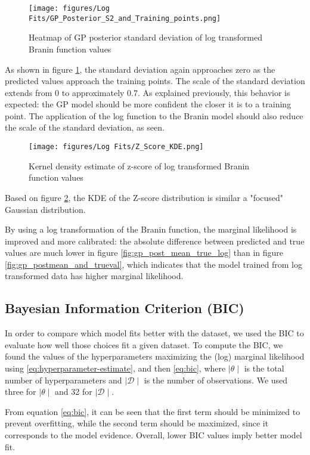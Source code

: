 \documentclass[11pt]{article}
\newcommand{\mc}[1]{\mathcal{#1}}
\newcommand{\data}{\mc{D}}
\numberwithin{equation}{section}
\begin{document}
\begin{figure}[H]
  \centering
  \texttt{[image: figures/Log Fits/GP\_Posterior\_S2\_and\_Training\_points.png]}
  \caption{Heatmap of GP posterior standard deviation of log transformed Branin function values}
  \label{fig:gp_post_std_log}
\end{figure}
As shown in figure \ref{fig:gp_post_std_log}, the standard deviation again approaches zero as the predicted values approach the training points. The scale of the standard deviation extends from 0 to approximately 0.7. As explained previously, this behavior is expected: the GP model should be more confident the closer it is to a training point. The application of the log function to the Branin model should also reduce the scale of the standard deviation, as seen. 

\begin{figure}[H]
  \centering
  \texttt{[image: figures/Log Fits/Z\_Score\_KDE.png]}
  \caption{Kernel density estimate of z-score of log transformed Branin function values}
  \label{fig:zscore_kde_log}
\end{figure}
Based on figure \ref{fig:zscore_kde_log}, the KDE of the Z-score distribution is similar a "focused" Gaussian distribution.

By using a log transformation of the Branin function, the marginal likelihood is improved and more calibrated: the absolute difference between predicted and true values are much lower in figure \ref{fig:gp_post_mean_true_log} than in figure \ref{fig:gp_postmean_and_trueval}, which indicates that the model trained from log transformed data has higher marginal likelihood.

\subsection*{Bayesian Information Criterion (BIC)}
In order to compare which model fits better with the dataset, we used the BIC
to evaluate how well those choices fit a given dataset. To compute the BIC,
we found the values of the hyperparameters maximizing the (log) marginal
likelihood using \ref{eq:hyperparameter-estimate}, and then \ref{eq:bic},
where $\mid \theta \mid$ is the total number of hyperparameters and $\mid
\data \mid$ is the number of observations. We used three for $\mid \theta
\mid$ and 32 for $\mid \data \mid$.

From equation \ref{eq:bic}, it can be seen that the first term should be
minimized to prevent overfitting, while the second term should be maximized,
since it corresponds to the model evidence. Overall, lower BIC values imply
better model fit.
\end{document}
